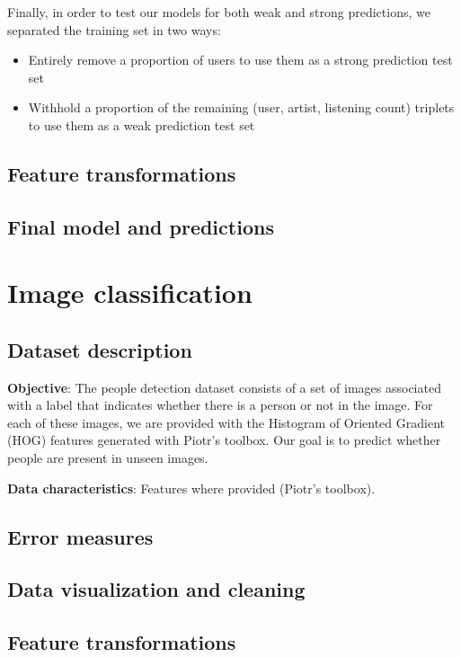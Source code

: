 \documentclass{article}
\begin{document}
  Finally, in order to test our models for both weak and strong predictions, we separated the training set in two ways:
  \begin{itemize}
    \item Entirely remove a proportion of users to use them as a strong prediction test set
    \item Withhold a proportion of the remaining (user, artist, listening count) triplets to use them as a weak prediction test set
  \end{itemize}

  \subsection{Feature transformations}

  \subsection{Final model and predictions}



\section{Image classification}

  \subsection{Dataset description}
  \textbf{Objective}: The people detection dataset consists of a set of images associated with a label that indicates whether there is a person or not in the image. For each of these images, we are provided with the Histogram of Oriented Gradient (HOG) features generated with Piotr's toolbox. Our goal is to predict whether people are present in unseen images.

  \textbf{Data characteristics}: Features where provided (Piotr's toolbox).

  \subsection{Error measures}

  \subsection{Data visualization and cleaning}

  \subsection{Feature transformations}
  
\end{document}
